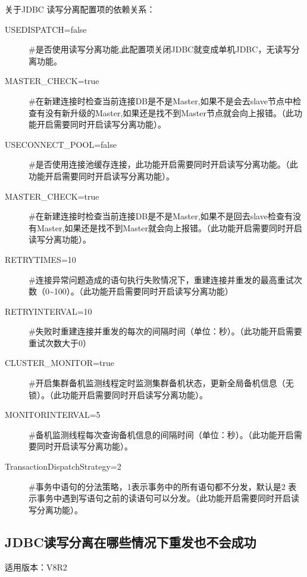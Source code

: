 \documentclass[letterpaper,10pt,english]{sphinxmanual}
\begin{document}
关于JDBC 读写分离配置项的依赖关系：
\begin{description}
\item[{USEDISPATCH=false}] \leavevmode
\#是否使用读写分离功能,此配置项关闭JDBC就变成单机JDBC，无读写分离功能。

\item[{MASTER\_CHECK=true}] \leavevmode
\#在新建连接时检查当前连接DB是不是Master,如果不是会去slave节点中检查有没有新升级的Master,如果还是找不到Master节点就会向上报错。（此功能开启需要同时开启读写分离功能）。

\item[{USECONNECT\_POOL=false}] \leavevmode
\#是否使用连接池缓存连接，此功能开启需要同时开启读写分离功能。（此功能开启需要同时开启读写分离功能）。

\item[{MASTER\_CHECK=true}] \leavevmode
\#在新建连接时检查当前连接DB是不是Master,如果不是回去slave检查有没有Master,如果还是找不到Master就会向上报错。（此功能开启需要同时开启读写分离功能）。

\item[{RETRYTIMES=10}] \leavevmode
\#连接异常问题造成的语句执行失败情况下，重建连接并重发的最高重试次数（0\textasciitilde{}100）。（此功能开启需要同时开启读写分离功能）

\item[{RETRYINTERVAL=10}] \leavevmode
\#失败时重建连接并重发的每次的间隔时间（单位：秒）。（此功能开启需要重试次数大于0）

\item[{CLUSTER\_MONITOR=true}] \leavevmode
\#开启集群备机监测线程定时监测集群备机状态，更新全局备机信息（无锁）。（此功能开启需要同时开启读写分离功能）。

\item[{MONITORINTERVAL=5}] \leavevmode
\#备机监测线程每次查询备机信息的间隔时间（单位：秒）。（此功能开启需要同时开启读写分离功能）。

\item[{TransactionDispatchStrategy=2}] \leavevmode
\#事务中语句的分法策略，1表示事务中的所有语句都不分发，默认是2 表示事务中遇到写语句之前的读语句可以分发。（此功能开启需要同时开启读写分离功能）。

\end{description}


\subsection{JDBC读写分离在哪些情况下重发也不会成功}
\label{\detokenize{interface/jdbc:id8}}
适用版本：V8R2
\end{document}
